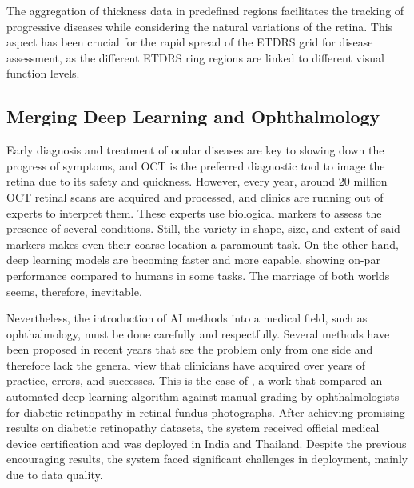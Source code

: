 The aggregation of thickness data in predefined regions facilitates the tracking of progressive diseases while considering the natural variations of the retina. This aspect has been crucial for the rapid spread of the ETDRS grid for disease assessment, as the different ETDRS ring regions are linked to different visual function levels. 

\subsection{Merging Deep Learning and Ophthalmology}
Early diagnosis and treatment of ocular diseases are key to slowing down the progress of symptoms, and OCT is the preferred diagnostic tool to image the retina due to its safety and quickness. However, every year, around 20 million OCT retinal scans are acquired and processed, and clinics are running out of experts to interpret them. These experts use biological markers to assess the presence of several conditions. Still, the variety in shape, size, and extent of said markers makes even their coarse location a paramount task. On the other hand, deep learning models are becoming faster and more capable, showing on-par performance compared to humans in some tasks. The marriage of both worlds seems, therefore, inevitable. 

Nevertheless, the introduction of AI methods into a medical field, such as ophthalmology, must be done carefully and respectfully. Several methods have been proposed in recent years that see the problem only from one side  and therefore lack the general view that clinicians have acquired over years of practice, errors, and successes. This is the case of , a work that compared an automated deep learning algorithm against manual grading by ophthalmologists for diabetic retinopathy in retinal fundus photographs. After achieving promising results on diabetic retinopathy datasets, the system received official medical device certification and was deployed in India and Thailand. Despite the previous encouraging results, the system faced significant challenges in deployment, mainly due to data quality.
